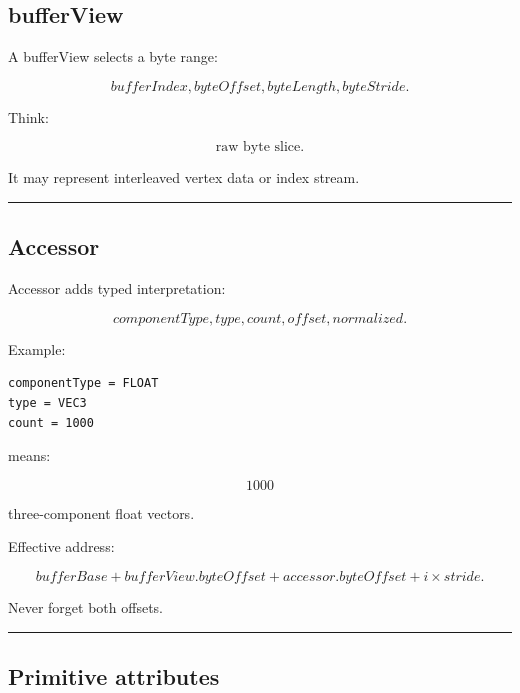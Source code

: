 \subsection{bufferView}\label{04-visual-computing-ii-ch041-bufferview}

\hypertarget{04-visual-computing-ii-ch041-bufferview}{}

A bufferView selects a byte range:

\[
bufferIndex,
byteOffset,
byteLength,
byteStride.
\]

Think:

\[
\boxed{
\text{raw byte slice}.
}
\]

It may represent interleaved vertex data or index stream.

\begin{center}\rule{0.5\linewidth}{0.5pt}\end{center}

\subsection{Accessor}\label{04-visual-computing-ii-ch041-accessor}

\hypertarget{04-visual-computing-ii-ch041-accessor}{}

Accessor adds typed interpretation:

\[
componentType,
type,
count,
offset,
normalized.
\]

Example:

\begin{verbatim}
componentType = FLOAT
type = VEC3
count = 1000
\end{verbatim}

means:

\[
1000
\]

three-component float vectors.

Effective address:

\[
\boxed{
bufferBase
+
bufferView.byteOffset
+
accessor.byteOffset
+
i\times stride.
}
\]

Never forget both offsets.

\begin{center}\rule{0.5\linewidth}{0.5pt}\end{center}

\subsection{Primitive attributes}\label{04-visual-computing-ii-ch041-primitive-attributes}

